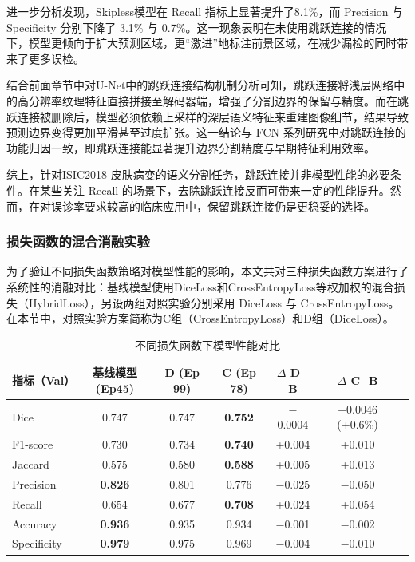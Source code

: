 进一步分析发现，Skipless模型在 Recall 指标上显著提升了8.1\%，而 Precision 与 Specificity 分别下降了 3.1\% 与 0.7\%。这一现象表明在未使用跳跃连接的情况下，模型更倾向于扩大预测区域，更“激进”地标注前景区域，在减少漏检的同时带来了更多误检。

结合前面章节中对U-Net中的跳跃连接结构机制分析可知，跳跃连接将浅层网络中的高分辨率纹理特征直接拼接至解码器端，增强了分割边界的保留与精度。而在跳跃连接被删除后，模型必须依赖上采样的深层语义特征来重建图像细节，结果导致预测边界变得更加平滑甚至过度扩张。这一结论与 FCN 系列研究中对跳跃连接的功能归因一致，即跳跃连接能显著提升边界分割精度与早期特征利用效率\cite{milletari2016}。

综上，针对ISIC2018 皮肤病变的语义分割任务，跳跃连接并非模型性能的必要条件。在某些关注 Recall 的场景下，去除跳跃连接反而可带来一定的性能提升。然而，在对误诊率要求较高的临床应用中，保留跳跃连接仍是更稳妥的选择。

\subsubsection{损失函数的混合消融实验}

为了验证不同损失函数策略对模型性能的影响，本文共对三种损失函数方案进行了系统性的消融对比：基线模型使用DiceLoss和CrossEntropyLoss等权加权的混合损失（HybridLoss），另设两组对照实验分别采用 DiceLoss 与 CrossEntropyLoss。在本节中，对照实验方案简称为C组（CrossEntropyLoss）和D组（DiceLoss）。

\begin{table}[htbp]
    \centering
    \caption{不同损失函数下模型性能对比}
    \label{tab:loss_ablation}
    \begin{tabular}{lcccccc}
        \toprule
        指标（Val） & 基线模型(Ep45) & D (Ep 99) & C (Ep 78) & $\Delta$ D$-$B & $\Delta$ C$-$B \\
        \midrule
        Dice        & 0.747 & 0.747 & \textbf{0.752} & $-$0.0004 & +0.0046 (+0.6\%) \\
        F1-score    & 0.730 & 0.734 & \textbf{0.740} & +0.004 & +0.010 \\
        Jaccard     & 0.575 & 0.580 & \textbf{0.588} & +0.005 & +0.013 \\
        Precision   & \textbf{0.826} & 0.801 & 0.776 & $-$0.025 & $-$0.050 \\
        Recall      & 0.654 & 0.677 & \textbf{0.708} & +0.024 & +0.054 \\
        Accuracy    & \textbf{0.936} & 0.935 & 0.934 & $-$0.001 & $-$0.002 \\
        Specificity & \textbf{0.979} & 0.975 & 0.969 & $-$0.004 & $-$0.010 \\
        \bottomrule
    \end{tabular}
\end{table}


